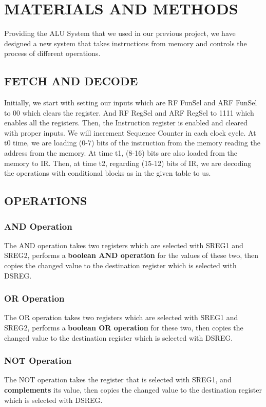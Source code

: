 \documentclass[pdftex,12pt,a4paper]{article}
\begin{document}
\section{MATERIALS AND METHODS}
Providing the ALU System that we used in our previous project, we have designed a new system that takes instructions from memory and controls the process of different operations.

\subsection{FETCH AND DECODE}
Initially, we start with setting our inputs which are RF FunSel and ARF FunSel to 00 which clears the register. And RF RegSel and ARF RegSel to 1111 which enables all the registers. Then, the Instruction register is enabled and cleared with proper inputs. We will increment Sequence Counter in each clock cycle. At t0 time, we are loading (0-7) bits of the instruction from the memory reading the address from the memory. At time t1, (8-16) bits are also loaded from the memory to IR. Then, at time t2, regarding (15-12) bits of IR, we are decoding the operations with conditional blocks as in the given table to us.

\subsection{OPERATIONS}


\subsubsection{\textbf{AND} Operation}
The AND operation takes two registers which are selected with SREG1 and SREG2, performs a \textbf{boolean AND operation} for the values of these two, then copies the changed value to the destination register which is selected with DSREG.

\subsubsection{\textbf{OR} Operation}
The OR operation takes two registers which are selected with SREG1 and SREG2, performs a \textbf{boolean OR operation} for these two, then copies the changed value to the destination register which is selected with DSREG. 

\subsubsection{\textbf{NOT} Operation}
The NOT operation takes the register that is selected with SREG1, and \textbf{complements} its value, then copies the changed value to the destination register which is selected with DSREG.
\end{document}
